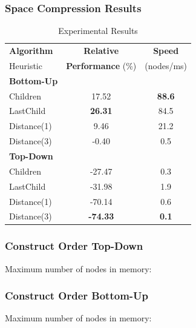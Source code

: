 \documentclass{beamer}
\begin{document}
\begin{frame}

\frametitle{Space Compression Results}

\begin{table}[tb]
\centering
\begin{tabular}{l c c}
\toprule
\textbf{Algorithm} & \textbf{Relative} & \textbf{Speed}\\ 
Heuristic & \textbf{Performance} (\%) & (nodes/ms)\\ 
\midrule

\textbf{Bottom-Up} & & \\
Children & 17.52 & \textbf{88.6} \\ 
LastChild & \textbf{26.31} & 84.5 \\ 
Distance(1) & 9.46 & 21.2 \\ 
Distance(3) & -0.40 & 0.5\\ 

\midrule

\textbf{Top-Down} & & \\
Children & -27.47 & 0.3 \\
LastChild & -31.98 & 1.9 \\
Distance(1) & -70.14 & 0.6 \\ 
Distance(3) & \textbf{-74.33} & \textbf{0.1}\\ 

\bottomrule
\end{tabular}
\caption{Experimental Results}
\label{tab:results}
\end{table}

\end{frame}

\begin{frame}
	\frametitle{Construct Order Top-Down}
	\centering
	Maximum number of nodes in memory:
		 \\[1cm]
	
\end{frame}

\begin{frame}
	\frametitle{Construct Order Bottom-Up}
	\centering
	Maximum number of nodes in memory:
		 \\[1cm]
	
\end{frame}
\end{document}
